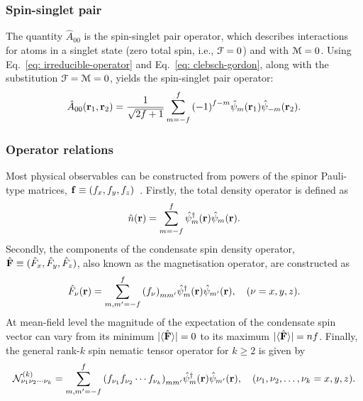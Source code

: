 \subsubsection{Spin-singlet pair}
The quantity \(\hat{A}_{00}\) is the spin-singlet pair operator, which describes
interactions for atoms in a singlet state (zero total spin, i.e.,
\(\EuScript{F} = 0\)) and with \(\EuScript{M} = 0\).
Using Eq.~\eqref{eq: irreducible-operator} and Eq.~\eqref{eq: clebsch-gordon},
along with the substitution \(\EuScript{F} = \EuScript{M} = 0\), yields the
spin-singlet pair operator:
\begin{align}
    \hat{A}_{00}(\vb{r}_1, \vb{r}_2) = \frac{1}{\sqrt{2f+1}}\sum_{m=-f}^{f}
    {(-1)}^{f-m}\hat{\psi}_m(\vb{r}_1)\hat{\psi}_{-m}(\vb{r}_2).
\end{align}

\subsubsection{Operator relations}
Most physical observables can be constructed from powers of the spinor
Pauli-type matrices, \(\vb{f} \equiv (f_x, f_y, f_z)\)~\cite{Kawaguchi2012}.
Firstly, the total density operator is defined as
\begin{align}
    \hat{n}(\vb{r}) = \sum_{m=-f}^{f}\hat{\psi}^\dagger_m(\vb{r})
    \hat{\psi}_m(\vb{r}).
\end{align}
Secondly, the components of the condensate spin density operator, \(\hat{\vb{F}}
\equiv (\hat{F}_x, \hat{F}_y, \hat{F}_z)\), also known as the magnetisation
operator, are constructed as
\begin{align}
    \hat{F}_\nu(\vb{r}) = \sum_{m,m'=-f}^{f}{\left(f_\nu\right)}_{mm'}
    \hat{\psi}^\dagger_m(\vb{r})\hat{\psi}_{m'}(\vb{r}), \quad
    (\nu = x, y, z).
\end{align}
At mean-field level the magnitude of the expectation of the condensate spin
vector can vary from its minimum \(|\langle \hat{\vb{F}} \rangle | = 0\) to its maximum
\(|\langle \hat{\vb{F}} \rangle | = nf\).
Finally, the general rank-\(k\) spin nematic tensor operator for \(k \geq 2\) is
given by
\begin{align}
    \mathcal{N}^{(k)}_{\nu_1\nu_2\cdots\nu_k} = \sum_{m,m'=-f}^{f}
    {\left(f_{\nu_1}f_{\nu_2}\cdots f_{\nu_k}\right)}_{mm'}
    \hat{\psi}^\dagger_m(\vb{r})\hat{\psi}_{m'}(\vb{r}), \quad
    (\nu_1, \nu_2, \ldots, \nu_k = x, y, z).
\end{align}

